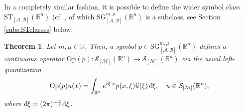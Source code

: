 \documentclass[11pt,reqno]{amsart}
\numberwithin{equation}{section}
\newcommand{\dbar}{\mathrm{d}\hspace*{-0.15em}\bar{}\hspace*{0.1em}}
\newtheorem{theorem}{Theorem}[section]
\newcommand{\R}{{\mathbb{R}}} %
\newcommand{\SG}{{\mathrm{SG}}}
\newcommand{\ST}{{\mathrm{ST}}}
\newcommand{\M}{{\mathcal{M}}} %
\newcommand{\A}{{\mathcal{A}}} %
\newcommand{\B}{{\mathcal{B}}} %
\begin{document}
In a completely similar fashion, it is possible to define the wider symbol class $\ST_{[\A,\B]}(\R^n)$ (cf. \cite[Ch. 1, \S 1.1]{cordes}, of which 
${\SG}_{[\A,\B]}^{m,\mu}(\R^n)$ is a subclass, see Section \ref{subs:STclasses} below.

\begin{theorem}\label{cont_SG}
	Let $m,\mu\in\R$. Then, a symbol $p\in {\SG}_{[\A,\B]}^{m,\mu}(\R^n)$ defines a continuous operator $\mathrm{Op}(p):\mathcal{S}_{[\M]}(\R^n)\to \mathcal{S}_{[\M]}(\R^n)$ via the usual left-quantization
	\begin{equation}\label{Op_int} 
	\mathrm{Op}(p) u(x) = \int_{\R^n} e^{i\xi\cdot x}p(x,\xi)\widehat{u}(\xi)\,\dbar \xi,\quad u \in \mathcal{S}_{[\M]}(\R^n),
	\end{equation}
	where $\dbar\xi=(2\pi)^{-\frac{n}{2}}\mathrm{d}\xi$.
\end{theorem}
%
\end{document}
